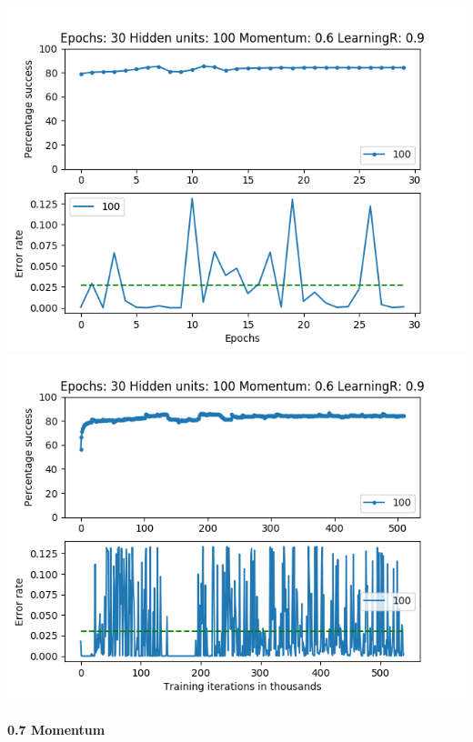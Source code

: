 \documentclass[11pt]{article}
\makeatletter
\def\maxwidth{\ifdim\Gin@nat@width>\linewidth\linewidth
    \else\Gin@nat@width\fi}
\let\Oldincludegraphics\includegraphics
\renewcommand{\includegraphics}[1]{\Oldincludegraphics[width=.8\maxwidth]{#1}}
\makeatother
\begin{document}
\includegraphics{Experiment2/E2_NN_Epoch_Momentum_0.6_30Epochs_100Hiddenunits.png}
\includegraphics{Experiment2/E2_NN_Training_Momentum_0.6_30Epochs_100Hiddenunits.png}

\hypertarget{momentum-7}{%
\paragraph{0.7 Momentum}\label{momentum-7}}
\end{document}
